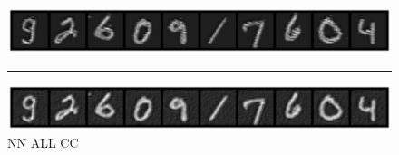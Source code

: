 \begin{figure}[h]
{    \centerline{\hspace*{8mm}\includegraphics[width=1.4\textwidth]{figures/reconstruction_MNIST_NN_ALL_epoch_100.png}}
    \caption*{\normalsize{NN ALL CC}}
    \rule{0.4\textwidth}{.4pt}
    
    \centerline{\hspace*{8mm}\includegraphics[width=1.4\textwidth]{figures/reconstruction_MNIST_NN_ALL_CC_epoch_100.png}}
}
\end{figure}
